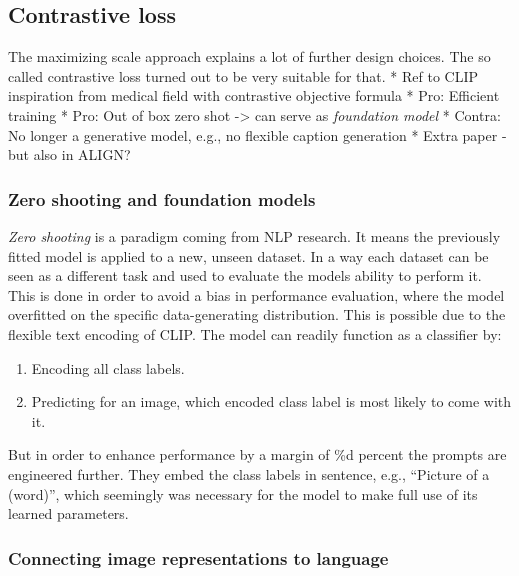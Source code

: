\documentclass[
]{krantz}
\providecommand{\tightlist}{%
  \setlength{\itemsep}{0pt}\setlength{\parskip}{0pt}}
\begin{document}
\hypertarget{contrastive-loss}{%
\subsection{Contrastive loss}\label{contrastive-loss}}

The maximizing scale approach explains a lot of further design choices.
The so called contrastive loss turned out to be very suitable for that.
* Ref to CLIP inspiration from medical field with contrastive objective formula
* Pro: Efficient training
* Pro: Out of box zero shot -\textgreater{} can serve as \emph{foundation model} \citep{bommasani2021opportunities}
* Contra: No longer a generative model, e.g., no flexible caption generation
* Extra paper - but also in ALIGN?

\hypertarget{zero-shooting-and-foundation-models}{%
\subsubsection{Zero shooting and foundation models}\label{zero-shooting-and-foundation-models}}

\emph{Zero shooting} is a paradigm coming from NLP research.
It means the previously fitted model is applied to a new, unseen dataset.
In a way each dataset can be seen as a different task and used to evaluate the models ability to perform it.
This is done in order to avoid a bias in performance evaluation, where the model overfitted on the specific data-generating distribution.
This is possible due to the flexible text encoding of CLIP.
The model can readily function as a classifier by:

\begin{enumerate}
\def\labelenumi{\arabic{enumi}.}
\tightlist
\item
  Encoding all class labels.
\item
  Predicting for an image, which encoded class label is most likely to come with it.
\end{enumerate}

But in order to enhance performance by a margin of \%d percent the prompts are engineered further.
They embed the class labels in sentence, e.g., ``Picture of a (word)'', which seemingly was necessary for the model to make full use of its learned parameters.

\hypertarget{connecting-image-representations-to-language}{%
\subsubsection{Connecting image representations to language}\label{connecting-image-representations-to-language}}
\end{document}
